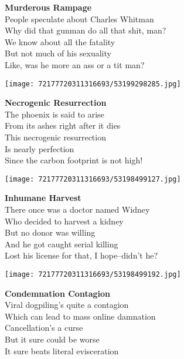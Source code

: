 \documentclass[10pt,letterpaper]{article}
\begin{document}
\begin{center}
\textbf{Murderous Rampage}\\
\vskip 0.2in
People speculate about Charles Whitman\\
Why did that gunman do all that shit, man?\\
We know about all the fatality\\
But not much of his sexuality\\
Like, was he more an ass or a tit man?\\
\end{center}
\pagebreak

\begin{center}
\texttt{[image: 72177720311316693/53199298285.jpg]}
\end{center}

\begin{center}
\textbf{Necrogenic Resurrection}\\
\vskip 0.2in
The phoenix is said to arise\\
From its ashes right after it dies\\
This necrogenic resurrection\\
Is nearly perfection\\
Since the carbon footprint is not high!\\
\end{center}
\pagebreak

\begin{center}\texttt{[image: 72177720311316693/53198499127.jpg]}
\end{center}
\begin{center}
\textbf{Inhumane Harvest}\\
\vskip 0.2in
There once was a doctor named Widney\\
Who decided to harvest a kidney\\
But no donor was willing\\
And he got caught serial killing\\
Lost his license for that, I hope--didn't he?\\
\end{center}

\pagebreak
\begin{center}
\texttt{[image: 72177720311316693/53198499192.jpg]}
\end{center}

\begin{center}
\textbf{Condemnation Contagion}\\
\vskip 0.2in
Viral dogpiling's quite a contagion\\
Which can lead to mass online damnation\\
Cancellation's a curse\\
But it sure could be worse\\
It sure beats literal evisceration\\
\end{center}
\pagebreak
\end{document}
